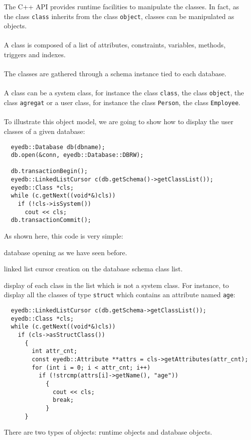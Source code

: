The \eyedb C++ API provides runtime facilities to manipulate the \eyedb
classes. In fact, as the class \texttt{class} inherits from the
class \texttt{object}, \eyedb classes can be manipulated as objects.
\\
\\
A class is composed of a list of attributes, constraints,
variables, methods, triggers and indexes.
\\
\\
The classes are gathered through a schema instance tied to
each database.
\\
\\
A class can be a system class, for instance the class \texttt{class}, the
class \texttt{object}, the class \texttt{agregat} or a user class, for
instance the class \texttt{Person}, the class \texttt{Employee}.
\\
\\
To illustrate this object model, we are going to show how to display the
user classes of a given database:
\verbsize
\begin{verbatim}
  eyedb::Database db(dbname);
  db.open(&conn, eyedb::Database::DBRW);

  db.transactionBegin();
  eyedb::LinkedListCursor c(db.getSchema()->getClassList());
  eyedb::Class *cls;
  while (c.getNext((void*&)cls))
    if (!cls->isSystem())
      cout << cls;
  db.transactionCommit();
\end{verbatim}
\normalsize
As shown here, this code is very simple:
\be
\item database opening as we have seen before.
\item linked list cursor creation on the database schema class list.
\item display of each class in the list which is not a system class.
\ee
For instance, to display all the classes of type \texttt{struct} which contains
an attribute named \texttt{age}:
\verbsize
\begin{verbatim}
  eyedb::LinkedListCursor c(db.getSchema->getClassList());
  eyedb::Class *cls;
  while (c.getNext((void*&)cls))
    if (cls->asStructClass())
      {
        int attr_cnt;
        const eyedb::Attribute **attrs = cls->getAttributes(attr_cnt);
        for (int i = 0; i < attr_cnt; i++)
          if (!strcmp(attrs[i]->getName(), "age"))
            {
              cout << cls;
              break;
            }
      }
\end{verbatim}
\normalsize
{}
There are two types of objects: runtime objects and database objects.
